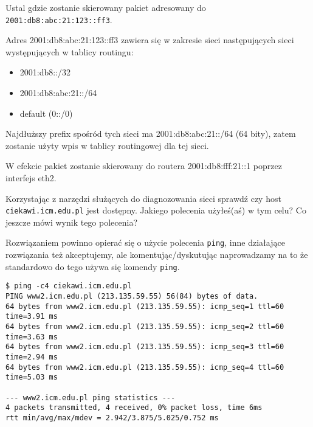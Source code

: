 Ustal gdzie zostanie skierowany pakiet adresowany do \Verb$2001:db8:abc:21:123::ff3$.
\fi

\dbEntryCheckResults
Adres 2001:db8:abc:21:123::ff3 zawiera się w zakresie sieci następujących sieci występujących w tablicy routingu:
\begin{itemize}
	\item 2001:db8::/32
	\item 2001:db8:abc:21::/64 
	\item default (0::/0)
\end{itemize}

Najdłuższy prefix spośród tych sieci ma 2001:db8:abc:21::/64 (64 bity), zatem zostanie użyty wpis w tablicy routingowej dla tej sieci.

W efekcie pakiet zostanie skierowany do routera 2001:db8:fff:21::1 poprzez interfejs eth2.
\fi


\dbEntryCheckResults
Korzystając z narzędzi służących do diagnozowania sieci sprawdź czy host \Verb#ciekawi.icm.edu.pl# jest dostępny.
Jakiego polecenia użyłeś(aś) w tym celu? Co jeszcze mówi wynik tego polecenia?

\begin{teacherOnly}
Rozwiązaniem powinno opierać się o użycie polecenia \Verb#ping#, inne działające rozwiązania też akceptujemy, ale komentując/dyskutując naprowadzamy na to że standardowo do tego używa się komendy \Verb#ping#.
\end{teacherOnly}
\fi

\dbEntryCheckResults
\begin{Verbatim}
$ ping -c4 ciekawi.icm.edu.pl
PING www2.icm.edu.pl (213.135.59.55) 56(84) bytes of data.
64 bytes from www2.icm.edu.pl (213.135.59.55): icmp_seq=1 ttl=60 time=3.91 ms
64 bytes from www2.icm.edu.pl (213.135.59.55): icmp_seq=2 ttl=60 time=3.63 ms
64 bytes from www2.icm.edu.pl (213.135.59.55): icmp_seq=3 ttl=60 time=2.94 ms
64 bytes from www2.icm.edu.pl (213.135.59.55): icmp_seq=4 ttl=60 time=5.03 ms

--- www2.icm.edu.pl ping statistics ---
4 packets transmitted, 4 received, 0% packet loss, time 6ms
rtt min/avg/max/mdev = 2.942/3.875/5.025/0.752 ms
\end{Verbatim}


